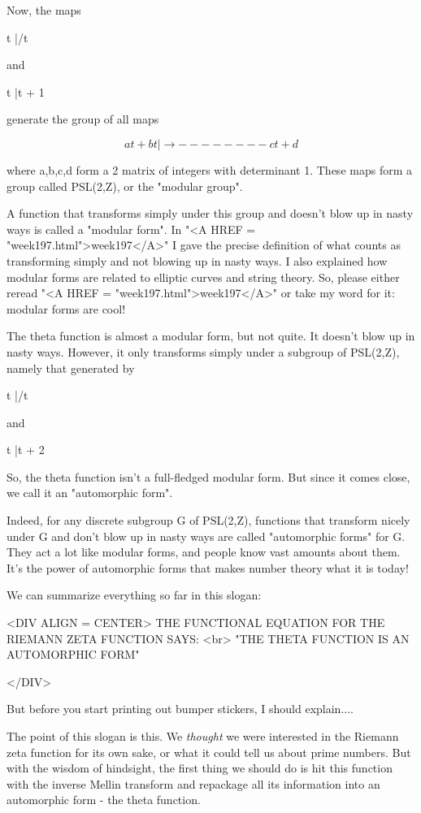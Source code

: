 Now, the maps

t |/t

and 

t |\to  t + 1

generate the group of all maps

$$
       at + b
t |\to   --------
       ct + d
$$
    
where a,b,c,d form a 2 matrix of integers with determinant 1.  
These maps form a group called PSL(2,Z), or the "modular group".  

A function that transforms simply under this group and doesn't blow up 
in nasty ways is called a "modular form".  In "<A HREF = "week197.html">week197</A>" I gave the precise 
definition of what counts as transforming simply and not blowing up in 
nasty ways.  I also explained how modular forms are related to elliptic 
curves and string theory.  So, please either reread "<A HREF = "week197.html">week197</A>" or take my 
word for it: modular forms are cool!  

The theta function is almost a modular form, but not quite.  It doesn't 
blow up in nasty ways.  However, it only transforms simply under a subgroup 
of PSL(2,Z), namely that generated by 

t |/t

and

t |\to  t + 2

So, the theta function isn't a full-fledged modular form.  
But since it comes close, we call it an "automorphic form".

Indeed, for any discrete subgroup G of PSL(2,Z), functions that transform 
nicely under G and don't blow up in nasty ways are called "automorphic forms" 
for G.  They act a lot like modular forms, and people know vast amounts 
about them.  It's the power of automorphic forms that makes number theory 
what it is today!

We can summarize everything so far in this slogan:

<DIV ALIGN = CENTER>
    THE FUNCTIONAL EQUATION FOR THE RIEMANN ZETA FUNCTION SAYS: <br> 
           "THE THETA FUNCTION IS AN AUTOMORPHIC FORM"

</DIV>

But before you start printing out bumper stickers, I should explain....


The point of this slogan is this.  We \emph{thought} we were interested in 
the Riemann zeta function for its own sake, or what it could tell us 
about prime numbers.  But with the wisdom of hindsight, the first thing we 
should do is hit this function with the inverse 
Mellin transform and repackage all 
its information into an automorphic form - the theta function.  

